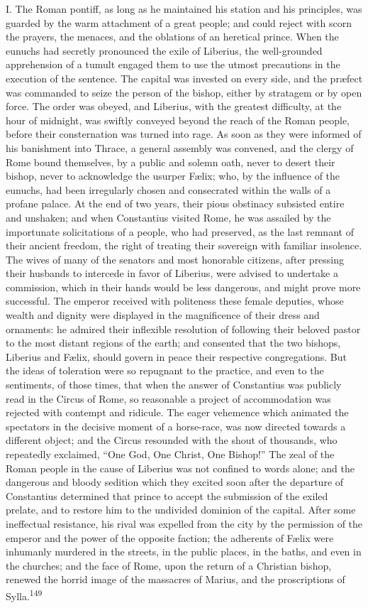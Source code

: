 I. The Roman pontiff, as long as he maintained his station and
his principles, was guarded by the warm attachment of a great
people; and could reject with scorn the prayers, the menaces, and
the oblations of an heretical prince. When the eunuchs had
secretly pronounced the exile of Liberius, the well-grounded
apprehension of a tumult engaged them to use the utmost
precautions in the execution of the sentence. The capital was
invested on every side, and the præfect was commanded to seize
the person of the bishop, either by stratagem or by open force.
The order was obeyed, and Liberius, with the greatest difficulty,
at the hour of midnight, was swiftly conveyed beyond the reach of
the Roman people, before their consternation was turned into
rage. As soon as they were informed of his banishment into
Thrace, a general assembly was convened, and the clergy of Rome
bound themselves, by a public and solemn oath, never to desert
their bishop, never to acknowledge the usurper Fælix; who, by the
influence of the eunuchs, had been irregularly chosen and
consecrated within the walls of a profane palace. At the end of
two years, their pious obstinacy subsisted entire and unshaken;
and when Constantius visited Rome, he was assailed by the
importunate solicitations of a people, who had preserved, as the
last remnant of their ancient freedom, the right of treating
their sovereign with familiar insolence. The wives of many of the
senators and most honorable citizens, after pressing their
husbands to intercede in favor of Liberius, were advised to
undertake a commission, which in their hands would be less
dangerous, and might prove more successful. The emperor received
with politeness these female deputies, whose wealth and dignity
were displayed in the magnificence of their dress and ornaments:
he admired their inflexible resolution of following their beloved
pastor to the most distant regions of the earth; and consented
that the two bishops, Liberius and Fælix, should govern in peace
their respective congregations. But the ideas of toleration were
so repugnant to the practice, and even to the sentiments, of
those times, that when the answer of Constantius was publicly
read in the Circus of Rome, so reasonable a project of
accommodation was rejected with contempt and ridicule. The eager
vehemence which animated the spectators in the decisive moment of
a horse-race, was now directed towards a different object; and
the Circus resounded with the shout of thousands, who repeatedly
exclaimed, “One God, One Christ, One Bishop!” The zeal of the
Roman people in the cause of Liberius was not confined to words
alone; and the dangerous and bloody sedition which they excited
soon after the departure of Constantius determined that prince to
accept the submission of the exiled prelate, and to restore him
to the undivided dominion of the capital. After some ineffectual
resistance, his rival was expelled from the city by the
permission of the emperor and the power of the opposite faction;
the adherents of Fælix were inhumanly murdered in the streets, in
the public places, in the baths, and even in the churches; and
the face of Rome, upon the return of a Christian bishop, renewed
the horrid image of the massacres of Marius, and the
proscriptions of Sylla.\textsuperscript{149}

